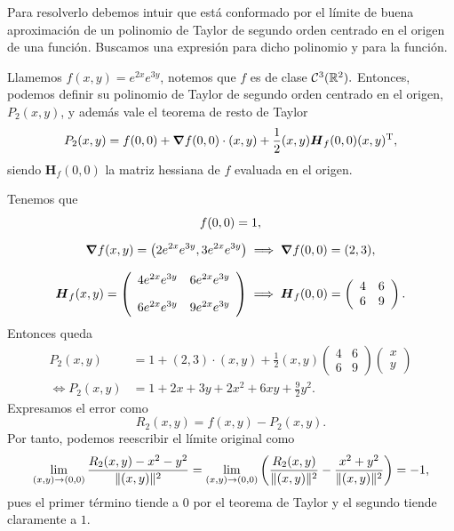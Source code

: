 
\begin{solution}
    Para resolverlo debemos intuir que está conformado por el límite de buena aproximación de un polinomio de Taylor de segundo orden centrado en el origen de una función. Buscamos una expresión para dicho polinomio y para la función.

    Llamemos $f(x,y) = e^{2x}e^{3y}$, notemos que $f$ es de clase $\mathcal{C}^3(\mathbb{R}^2).$  Entonces, podemos definir su polinomio de Taylor de segundo orden centrado en el origen, $ P_2(x,y)$, y adem\'as vale el teorema de resto de Taylor
    \[
        P_2(x,y) = f(0,0) + \grad f(0,0)\cdot(x,y) + \frac{1}{2}(x,y)\boldsymbol{H}_f(0,0)(x,y)^\mathrm{T},
    \]
    siendo $\boldsymbol{H}_f(0,0)$ la matriz hessiana de $f$ evaluada en el origen.

    Tenemos que
    \begin{gather*}
        f(0,0) = 1,\\[.2cm]
        \grad f(x,y) = \left(2e^{2x}e^{3y}, 3e^{2x}e^{3y}\right) \implies \grad f(0,0) = (2,3),\\[.25cm]
        \boldsymbol{H}_f(x,y) = \left(\begin{array}{cc}
                4e^{2x}e^{3y} & 6e^{2x}e^{3y} \\[10pt]
                6e^{2x}e^{3y} & 9e^{2x}e^{3y}
            \end{array}\right) \implies \boldsymbol{H}_f(0,0) = \left(\begin{array}{cc}
                4 & 6 \\
                6 & 9
            \end{array}\right).
    \end{gather*}
    Entonces queda
    \[
        \begin{aligned}
            P_2(x,y)      & = 1+(2,3)\cdot(x,y)+\frac{1}{2}(x,y)
            \left(\begin{array}{cc}  
                    4 & 6 \\
                    6 & 9
                \end{array}\right)
            \left(\begin{array}{cc}
                          x \\
                          y
                      \end{array}\right)                                                     \\[4pt]
            \iff P_2(x,y) & = 1 + 2x + 3y + 2x^2 + 6xy + \frac{9}{2}y^2.
        \end{aligned}
    \]
    Expresamos el error como
    \[
        R_2(x,y) = f(x,y) - P_2(x,y).
    \]
    Por tanto, podemos reescribir el límite original como
    \[\\[2pt]
        \lim_{(x,y) \to (0,0)} \frac{R_2(x,y) - x^2 - y^2}{\|(x,y)\|^2} =
        \lim_{(x,y) \to (0,0)} \left( \frac{R_2(x,y)}{\|(x,y)\|^2} - \frac{x^2+y^2}{\|(x,y)\|^2} \right) = -1,
    \]
    pues el primer término tiende a 0 por el teorema de Taylor  y el segundo  tiende claramente a $1.$
\end{solution}

